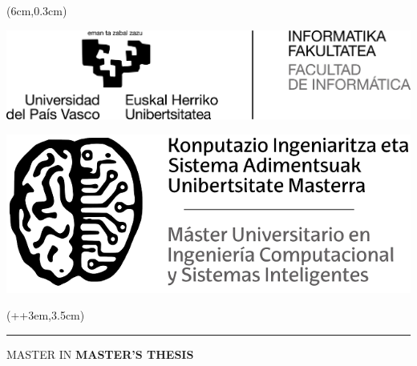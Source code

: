 
\begin{titlepage}
    \begin{textblock*}{\textwidth}(6cm,0.3cm)
        \begin{center}
            \begin{minipage}{0.45\textwidth}
                \centering
                \includegraphics[width=\linewidth]{images/shared/Logo_EHU.jpg}
            \end{minipage}\hfill
            \begin{minipage}{0.45\textwidth}
                \centering
                \includegraphics[width=0.7\linewidth]{images/shared/Logo_KISA.png} 
            \end{minipage}
        \end{center}
    \end{textblock*}
    
    
    
    \begin{textblock*}{\paperwidth}(\dimexpr\parindent+\oddsidemargin+3em\relax,3.5cm)
        \begin{minipage}{\dimexpr\linewidth-7.5cm\relax}
            \color{white}
            \noindent\rule{\linewidth}{0cm}
            \textsf{ {\large MASTER IN \master}}
            \newline
            \newline \newline
            \textsf{\textbf{ {\Huge MASTER'S THESIS }}}
        \end{minipage}
    \end{textblock*}
    

\end{titlepage}
